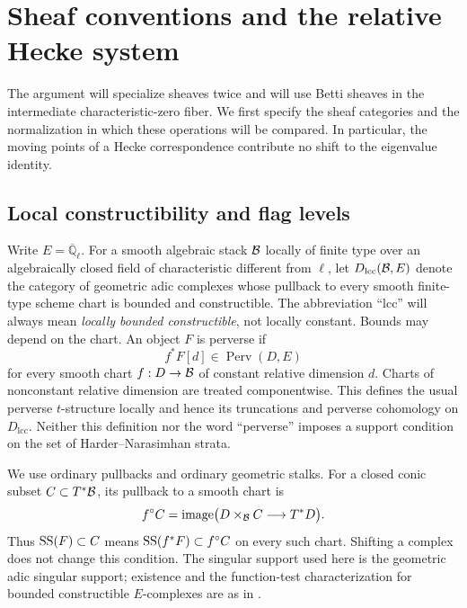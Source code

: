 \section{Sheaf conventions and the relative Hecke system}
\label{sec:foundations}

The argument will specialize sheaves twice and will use Betti sheaves in the
intermediate characteristic-zero fiber.  We first specify the sheaf categories
and the normalization in which these operations will be compared.  In
particular, the moving points of a Hecke correspondence contribute no shift to
the eigenvalue identity.

\subsection{Local constructibility and flag levels}

Write $E=\overline{\mathbb Q}_{\ell}$.  For a smooth algebraic stack $\mathcal B$
locally of finite type over an algebraically closed field of characteristic
different from $\ell$, let $D_{\mathrm{lcc}}(\mathcal B,E)$ denote the category of
geometric adic complexes whose pullback to every smooth finite-type scheme
chart is bounded and constructible.  The abbreviation ``lcc'' will always
mean \emph{locally bounded constructible}, not locally constant.  Bounds may
depend on the chart.  An object $F$ is perverse if
\[
                         f^*F[d]\in\operatorname{Perv}(D,E)
\]
for every smooth chart $f:D\to\mathcal B$ of constant relative dimension $d$.
Charts of nonconstant relative dimension are treated componentwise.  This
defines the usual perverse $t$-structure locally and hence its truncations
and perverse cohomology on $D_{\mathrm{lcc}}$.  Neither this definition nor
the word ``perverse'' imposes a support condition on the set of
Harder--Narasimhan strata.

We use ordinary pullbacks and ordinary geometric stalks.  For a closed conic
subset $C\subset T^*\mathcal B$, its pullback to a smooth chart is
\[
 f^{\circ}C
   =\operatorname{image}\bigl(D\mathbin{\times}_{\mathcal B}C
                                      \longrightarrow T^*D\bigr).
\]
Thus $\operatorname{SS}(F)\subset C$ means $\operatorname{SS}(f^*F)\subset f^{\circ}C$ on every such
chart.  Shifting a complex does not change this condition.  The singular
support used here is the geometric adic singular support; existence and the
function-test characterization for bounded constructible $E$-complexes are
as in \cite[\S1.5, Theorem~(vii)]{Barrett}.


